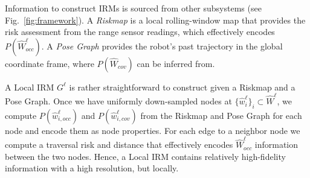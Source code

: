 \documentclass[letterpaper]{article} %
\newcommand{\phdone}[1]{} %
\begin{document}
\phdone{Information Sources}
Information to construct IRMs is sourced from other subsystems (see Fig.~\ref{fig:framework}).
A \textit{Riskmap} is a local rolling-window map that provides the risk assessment from the range sensor readings, %
which effectively encodes $P(\hat{W}^\ell_{occ})$.
A \textit{Pose Graph} %
provides the robot's past trajectory in the global coordinate frame, where $P(\hat{W}_{cov})$ can be inferred from.


\phdone{Local IRM}
%
A Local IRM $G^\ell$ is rather straightforward to construct given a Riskmap and a Pose Graph.
Once we have uniformly down-sampled nodes at $\{\hat{w}^\ell_i\}_i \subset \hat{W}^\ell$,
we compute $P(\hat{w}^\ell_{i,occ})$ and $P(\hat{w}^\ell_{i,cov})$ from the Riskmap and Pose Graph for each node and encode them as node properties.
For each edge to a neighbor node we compute a traversal risk and distance that effectively encodes $\hat{W}^\ell_{occ}$ information between the two nodes.
Hence, a Local IRM contains relatively high-fidelity information with a high resolution, but locally.
\end{document}
